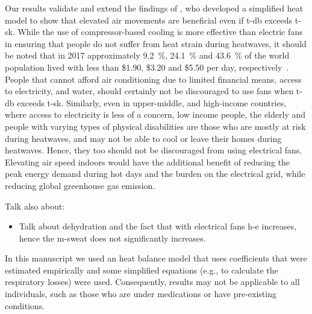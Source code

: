 Our results validate and extend the findings of , who developed a simplified heat model to show that elevated air movements are beneficial even if \ac{t-db} exceeds \acf{t-sk}.
While the use of compressor-based cooling is more effective than electric fans in ensuring that people do not suffer from heat strain during heatwaves, it should be noted that in 2017 approximately 9.2~\%, 24.1~\% and 43.6~\% of the world population lived with less than \$1.90, \$3.20 and \$5.50 per day, respectively~\cite{PovertyO1:online}.
People that cannot afford air conditioning due to limited financial means, access to electricity, and water, should certainly not be discouraged to use fans when \ac{t-db} exceeds \ac{t-sk}.
Similarly, even in upper-middle, and high-income countries, where access to electricity is less of a concern, low income people, the elderly and people with varying types of physical disabilities are those who are mostly at risk during heatwaves, and may not be able to cool or leave their homes during heatwaves.
Hence, they too should not be discouraged from using electrical fans.
Elevating air speed indoors would have the additional benefit of reducing the peak energy demand during hot days and the burden on the electrical grid, while reducing global greenhouse gas emission.


Talk also about:
\begin{itemize}
    \item Talk about dehydration and the fact that with electrical fans \ac{h-e} increases, hence the \ac{m-sweat} does not significantly increases. %
\end{itemize}

In this manuscript we used an heat balance model that uses coefficients that were estimated empirically and some simplified equations (e.g., to calculate the respiratory losses) were used.
Consequently, results may not be applicable to all individuals, such as those who are under medications or have pre-existing conditions.
